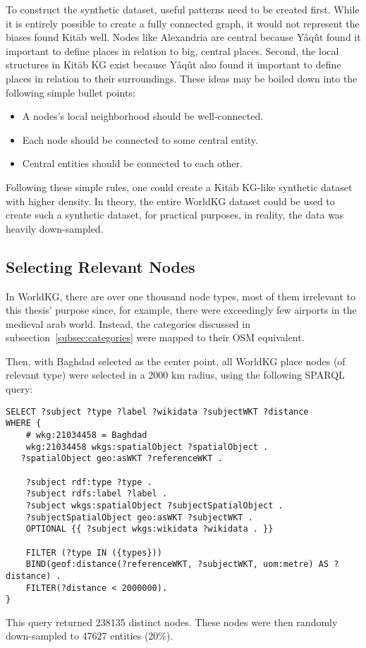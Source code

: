 To construct the synthetic dataset, useful patterns need to be created first.
While it is entirely possible to create a fully connected graph, it would not represent the biases found Kitāb well.
Nodes like Alexandria are central because Yâqût found it important to define places in relation to big, central places.
Second, the local structures in Kitāb KG exist because Yâqût also found it important to define places in relation
to their surroundings.
These ideas may be boiled down into the following simple bullet points:
\begin{itemize}
    \item A nodes's local neighborhood should be well-connected.
    \item Each node should be connected to some central entity.
    \item Central entities should be connected to each other.
\end{itemize}

Following these simple rules, one could create a Kitāb KG-like synthetic dataset with higher density.
In theory, the entire WorldKG dataset could be used to create such a synthetic dataset, for practical purposes,
in reality, the data was heavily down-sampled.

\subsection{Selecting Relevant Nodes}
In WorldKG, there are over one thousand node types, most of them irrelevant to this thesis' purpose since, for example,
there were exceedingly few airports in the medieval arab world.
Instead, the categories discussed in subsection~\ref{subsec:categories} were mapped to their OSM equivalent.

Then, with Baghdad selected as the center point, all WorldKG place nodes (of relevant type) were selected in a 2000 km
radius, using the following SPARQL query:

\begin{verbatim}
SELECT ?subject ?type ?label ?wikidata ?subjectWKT ?distance
WHERE {
    # wkg:21034458 = Baghdad
    wkg:21034458 wkgs:spatialObject ?spatialObject .
   ?spatialObject geo:asWKT ?referenceWKT .

    ?subject rdf:type ?type .
    ?subject rdfs:label ?label .
    ?subject wkgs:spatialObject ?subjectSpatialObject .
    ?subjectSpatialObject geo:asWKT ?subjectWKT .
    OPTIONAL {{ ?subject wkgs:wikidata ?wikidata . }}

    FILTER (?type IN ({types}))
    BIND(geof:distance(?referenceWKT, ?subjectWKT, uom:metre) AS ?distance) .
    FILTER(?distance < 2000000).
}

\end{verbatim}
This query returned 238135 distinct nodes.
These nodes were then randomly down-sampled to 47627 entities (20\%).

